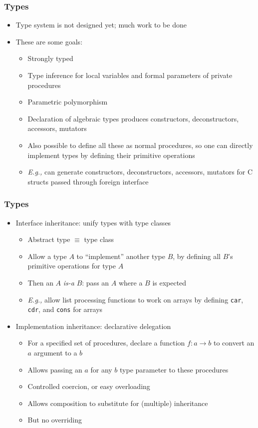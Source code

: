 \documentclass[12pt]{beamer}
\begin{document}
\begin{frame}
\frametitle{Types}
\begin{itemize}
\item Type system is not designed yet; much work to be done
\item These are some goals:
  \begin{itemize}
  \item Strongly typed
  \item Type inference for local variables and formal parameters of
    private procedures
  \item Parametric polymorphism
  \item Declaration of algebraic types produces constructors,
    deconstructors, accessors, mutators
  \item Also possible to define all these as normal procedures, so one
    can directly implement types by defining their primitive
    operations
  \item \emph{E.g.,} can generate  constructors, deconstructors,
    accessors, mutators for C structs passed through foreign interface
  \end{itemize}
\end{itemize}
\end{frame}


\begin{frame}
\frametitle{Types}
\begin{itemize}
\item Interface inheritance: unify types with type classes
  \begin{itemize}
  \item Abstract type $\equiv$ type class
  \item Allow a type $A$ to ``implement'' another type $B$, by
    defining all $B$'s primitive operations for type $A$
  \item Then an $A$ \emph{is-a} $B$: pass an $A$ where a $B$ is expected
  \item \emph{E.g.,} allow list processing functions to work on arrays
  by defining \texttt{car}, \texttt{cdr}, and \texttt{cons} for arrays
\end{itemize}
\item Implementation inheritance: declarative delegation
  \begin{itemize}
  \item For a specified set of procedures, 
    declare a function $f: a \to b$ to convert an $a$ argument to a $b$
  \item Allows passing an $a$ for any $b$ type parameter to these procedures
  \item Controlled coercion, or easy overloading
  \item Allows composition to substitute for (multiple) inheritance
  \item But no overriding
  \end{itemize}
\end{itemize}
\end{frame}
\end{document}
